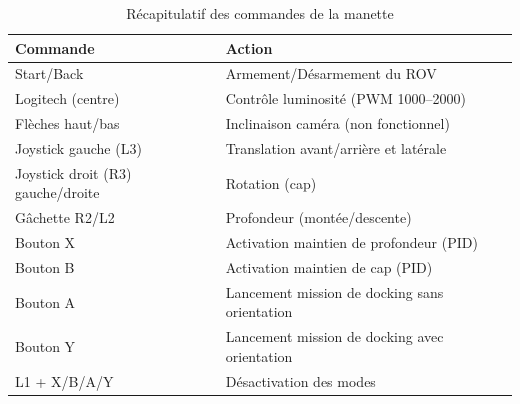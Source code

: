 \begin{appendices}
\begin{table}[h!]
\centering
\begin{tabular}{|l|l|}
\hline
\textbf{Commande} & \textbf{Action} \\
\hline
Start/Back & Armement/Désarmement du ROV \\
Logitech (centre) & Contrôle luminosité (PWM 1000--2000) \\
Flèches haut/bas & Inclinaison caméra (non fonctionnel) \\
Joystick gauche (L3) & Translation avant/arrière et latérale \\
Joystick droit (R3) gauche/droite & Rotation (cap) \\
Gâchette R2/L2 & Profondeur (montée/descente) \\
Bouton X & Activation maintien de profondeur (PID) \\
Bouton B & Activation maintien de cap (PID) \\
Bouton A & Lancement mission de docking sans orientation \\
Bouton Y & Lancement mission de docking avec orientation \\
L1 + X/B/A/Y & Désactivation des modes \\
\hline
\end{tabular}
\caption{Récapitulatif des commandes de la manette}
\label{tab:commandes_manette}
\end{table}

\end{appendices}